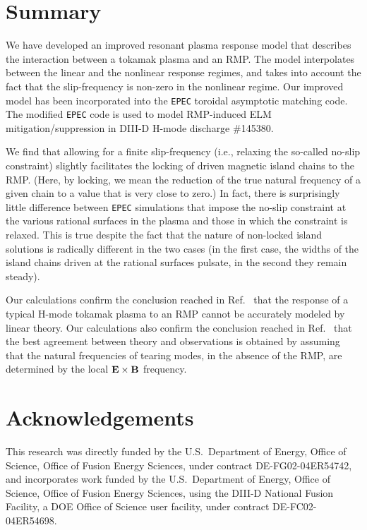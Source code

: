 \documentclass[12pt,prb,aps]{revtex4-1}
\begin{document}
\section{Summary}
We have developed an improved resonant plasma response model that describes the interaction between a tokamak plasma and an RMP. 
The model interpolates between the linear and the nonlinear response regimes, and takes into account the fact that the slip-frequency
is non-zero in the nonlinear regime. Our improved model has been incorporated into the {\tt EPEC} toroidal asymptotic matching code.\cite{rftor1}
The modified {\tt EPEC} code is used to model RMP-induced ELM mitigation/suppression in DIII-D H-mode discharge \#145380. 

We find that allowing for a finite slip-frequency (i.e., relaxing the so-called no-slip constraint) slightly facilitates the locking of
driven magnetic island chains to the RMP. (Here, by locking, we mean the reduction of the true natural frequency of a given chain to
a value that is very close to zero.) In fact, there is surprisingly little difference between {\tt EPEC} simulations that impose the
no-slip constraint at the various rational surfaces in the plasma and those in which the constraint is relaxed. This is true despite
the fact that the nature of non-locked island solutions is radically different in the two cases (in the first case, the widths of the island
chains driven at the rational surfaces pulsate, in the second they remain steady). 

Our calculations  confirm the conclusion reached in Ref.~
that the response of a typical H-mode tokamak plasma to an RMP cannot be accurately modeled by linear theory. Our calculations also
confirm the conclusion reached in Ref.~ that the best agreement between theory and observations is obtained by assuming that the
natural frequencies of tearing modes, in the absence of the RMP, are determined by the local ${\bf E}\times{\bf B}$ frequency.

\section*{Acknowledgements}
This research was directly funded by the U.S.\ Department of Energy, Office of Science, Office of Fusion Energy Sciences,  under contract DE-FG02-04ER54742, and
incorporates work funded by the U.S.\ Department of Energy, Office of Science, Office of Fusion Energy Sciences, using the DIII-D National Fusion Facility, a DOE Office of Science user facility, under contract DE-FC02-04ER54698.  
\end{document}

